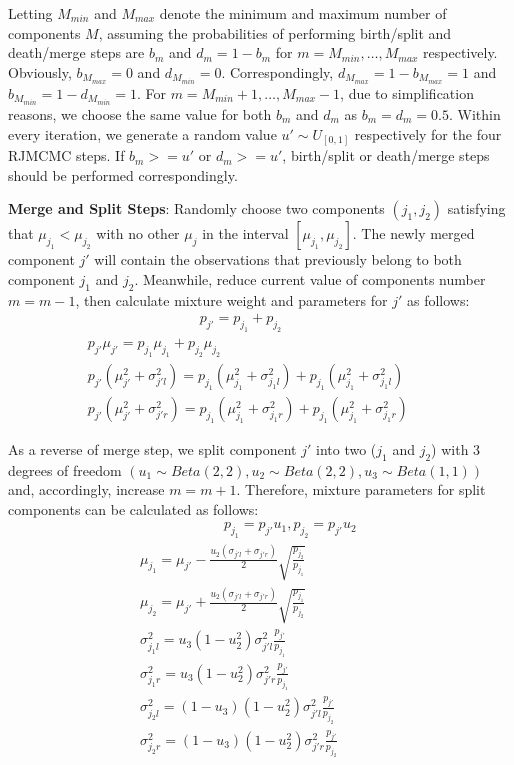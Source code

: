 \documentclass[conference]{IEEEtran}
\begin{document}
Letting $M_{min}$ and $M_{max}$ denote the minimum and maximum number of components $M$, assuming the probabilities of performing birth/split and death/merge steps are $b_m$ and $d_m = 1 - b_m$ for $m = M_{min},\dots,M_{max}$ respectively. Obviously, $b_{M_{max}}=0$ and $d_{M_{min}}=0$. Correspondingly, $d_{M_{max}}=1-b_{M_{max}} = 1$ and $b_{M_{min}}=1-d_{M_{min}}=1$. For $m=M_{min}+1,\dots,M_{max}-1$, due to simplification reasons, we choose the same value for both $b_m$ and $d_m$ as $b_m=d_m=0.5$. Within every iteration, we generate a random value $u' \sim U_{[0,1]}$ respectively for the four RJMCMC steps. If $b_m >= u'$ or $d_m >= u'$, birth/split or death/merge steps should be performed correspondingly.\cite{b1}

\textbf{Merge and Split Steps}: Randomly choose two components $(j_1,j_2)$ satisfying that $\mu_{j_1}<\mu_{j_2}$ with no other $\mu_j$ in the interval $[\mu_{j_1},\mu_{j_2}]$. The newly merged component $j'$ will contain the observations that previously belong to both component $j_1$ and $j_2$. Meanwhile, reduce current value of components number $m=m-1$, then calculate mixture weight and parameters for $j'$ as follows:
\begin{multline}
\qquad\qquad\qquad\qquad p_{j'} = p_{j_1}+p_{j_2} \\
p_{j'}\mu_{j'} = p_{j_1}\mu_{j_1} + p_{j_2}\mu_{j_2} \\
p_{j'}(\mu_{j'}^2 + \sigma_{j'l}^2) = p_{j_1}(\mu_{j_1}^2 + \sigma_{j_1l}^2)+p_{j_1}(\mu_{j_1}^2 + \sigma_{j_1l}^2) \qquad \\
p_{j'}(\mu_{j'}^2 + \sigma_{j'r}^2) = p_{j_1}(\mu_{j_1}^2 + \sigma_{j_1r}^2)+p_{j_1}(\mu_{j_1}^2 + \sigma_{j_1r}^2)
\label{eq:merge}
\end{multline}

As a reverse of merge step, we split component $j'$ into two ($j_1$ and $j_2$) with 3 degrees of freedom $(u_1 \sim Beta(2,2), u_2 \sim Beta(2,2), u_3 \sim Beta(1,1))$ and, accordingly, increase $m=m+1$. Therefore, mixture parameters for split components can be calculated as follows:
\begin{multline}
\qquad\qquad\qquad p_{j_1} = p_{j'}u_1, p_{j_2} = p_{j'}u_2 \\
\mu_{j_1} = \mu_{j'} - \frac{u_2(\sigma_{j'l}+\sigma_{j'r})}{2} \sqrt{\frac{p_{j_2}}{p_{j_1}}} \\
\mu_{j_2} = \mu_{j'} + \frac{u_2(\sigma_{j'l}+\sigma_{j'r})}{2} \sqrt{\frac{p_{j_1}}{p_{j_2}}} \\
\sigma_{j_1l}^2 = u_3(1-u_2^2)\sigma_{j'l}^2\frac{p_{j'}}{p_{j_1}} \\
\sigma_{j_1r}^2 = u_3(1-u_2^2)\sigma_{j'r}^2\frac{p_{j'}}{p_{j_1}} \\
\sigma_{j_2l}^2 = (1-u_3)(1-u_2^2)\sigma_{j'l}^2\frac{p_{j'}}{p_{j_2}} \\
\sigma_{j_2r}^2 = (1-u_3)(1-u_2^2)\sigma_{j'r}^2\frac{p_{j'}}{p_{j_2}} \qquad\quad
\label{eq:split}
\end{multline}
\end{document}
